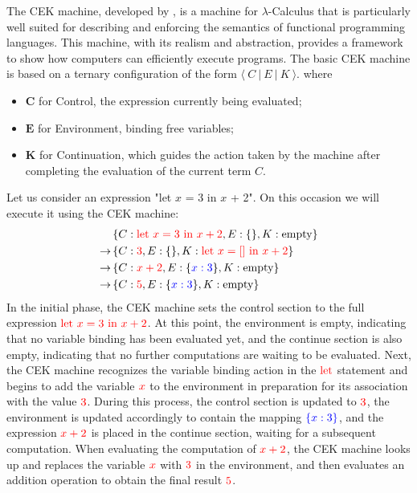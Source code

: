 \documentclass{l4proj}
\begin{document}
The CEK machine, developed by \cite{felleisen_1986_control}, is a machine for $\lambda$-Calculus that is particularly well suited for describing and enforcing the semantics of functional programming languages. This machine, with its realism and abstraction, provides a framework to show how computers can efficiently execute programs. The basic CEK machine is based on a ternary configuration of the form $ \langle \ C\:|\:E\:|\:K \ \rangle $. where
\begin{itemize}
    \item $\textbf{C}$ for Control, the expression currently being evaluated;
    \item $\textbf{E}$ for Environment, binding free variables;
    \item $\textbf{K}$ for Continuation, which guides the action taken by the machine after completing the evaluation of the current term $C$.
\end{itemize}
Let us consider an expression "let $x$ = 3 in $x$ + 2". On this occasion we will execute it using the CEK machine:
\begin{align*}
& \left\{C: \textcolor{red}{\text{let } x = 3 \text{ in } x + 2}, E: \{\}, K: \text{empty}\right\} \\
\rightarrow & \left\{C: \textcolor{red}{3}, E: \{\}, K: \textcolor{red}{\text{let } x = [] \text{ in } x + 2}\right\} \\
\rightarrow & \left\{C: \textcolor{red}{x + 2}, E: \{\textcolor{blue}{x: 3}\}, K: \text{empty}\right\} \\
\rightarrow & \left\{C: \textcolor{red}{5}, E: \{\textcolor{blue}{x: 3}\}, K: \text{empty}\right\}
\end{align*}
In the initial phase, the CEK machine sets the control section to the full expression $\color{red}{\text{let } x = 3 \text{ in } x + 2}$. At this point, the environment is empty, indicating that no variable binding has been evaluated yet, and the continue section is also empty, indicating that no further computations are waiting to be evaluated. Next, the CEK machine recognizes the variable binding action in the $\color{red}{\text{let}}$ statement and begins to add the variable $\color{red}{x}$ to the environment in preparation for its association with the value $\color{red}{3}$. During this process, the control section is updated to $\color{red}{3}$, the environment is updated accordingly to contain the mapping $\color{blue}{\{x: 3\}}$, and the expression $\color{red}{x + 2}$ is placed in the continue section, waiting for a subsequent computation. When evaluating the computation of $\color{red}{x + 2}$, the CEK machine looks up and replaces the variable $\color{red}{x}$ with $\color{red}{3}$ in the environment, and then evaluates an addition operation to obtain the final result $\color{red}{5}$.
\end{document}
